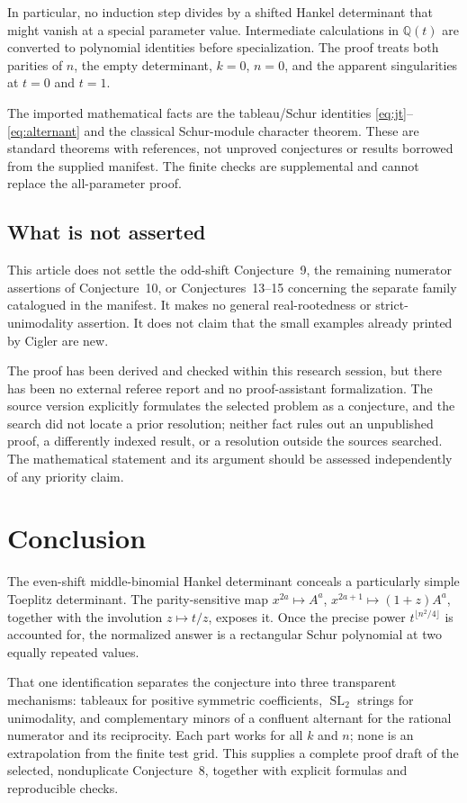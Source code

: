 \documentclass[11pt,a4paper]{article}
\theoremstyle{definition}
\theoremstyle{remark}
\newcommand{\Q}{\mathbb Q}
\newcommand{\SL}{\operatorname{SL}}
\numberwithin{equation}{section}
\begin{document}
In particular, no induction step divides by a shifted Hankel determinant
that might vanish at a special parameter value. Intermediate calculations
in \(\Q(t)\) are converted to polynomial identities before specialization.
The proof treats both parities of \(n\), the empty determinant, \(k=0\),
\(n=0\), and the apparent singularities at \(t=0\) and \(t=1\).

The imported mathematical facts are the tableau/Schur identities
\eqref{eq:jt}--\eqref{eq:alternant} and the classical Schur-module
character theorem. These are standard theorems with references, not
unproved conjectures or results borrowed from the supplied manifest.
The finite checks are supplemental and cannot replace the all-parameter
proof.

\subsection{What is not asserted}
This article does not settle the odd-shift Conjecture~9, the remaining
numerator assertions of Conjecture~10, or Conjectures~13--15 concerning
the separate family catalogued in the manifest. It makes no general
real-rootedness or strict-unimodality assertion. It does not claim that the
small examples already printed by Cigler are new.

The proof has been derived and checked within this research session, but
there has been no external referee report and no proof-assistant
formalization. The source version explicitly formulates the selected
problem as a conjecture, and the search did not locate a prior resolution;
neither fact rules out an unpublished proof, a differently indexed result,
or a resolution outside the sources searched. The mathematical statement
and its argument should be assessed independently of any priority claim.

\section{Conclusion}
The even-shift middle-binomial Hankel determinant conceals a particularly
simple Toeplitz determinant. The parity-sensitive map
\(x^{2a}\mapsto A^a\), \(x^{2a+1}\mapsto(1+z)A^a\), together with the
involution \(z\mapsto t/z\), exposes it. Once the precise power
\(t^{\lfloor n^2/4\rfloor}\) is accounted for, the normalized answer is a
rectangular Schur polynomial at two equally repeated values.

That one identification separates the conjecture into three transparent
mechanisms: tableaux for positive symmetric coefficients, \(\SL_2\)
strings for unimodality, and complementary minors of a confluent alternant
for the rational numerator and its reciprocity. Each part works for all
\(k\) and \(n\); none is an extrapolation from the finite test grid.
This supplies a complete proof draft of the selected, nonduplicate
Conjecture~8, together with explicit formulas and reproducible checks.
\end{document}
